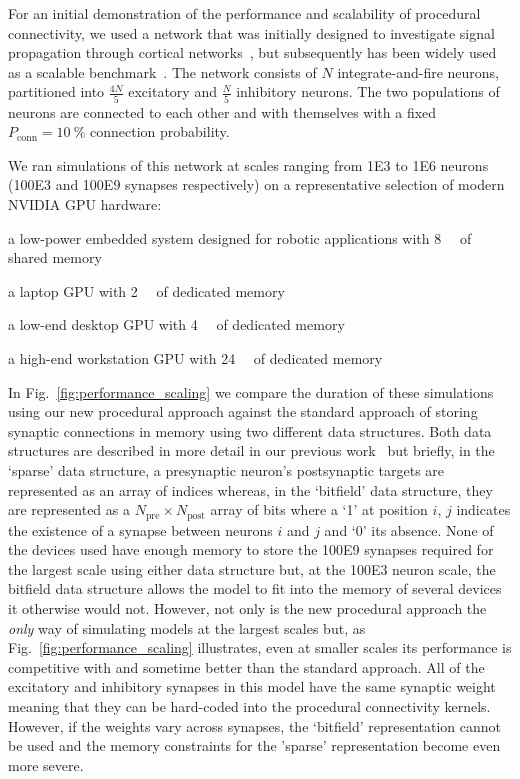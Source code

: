 \documentclass[9pt,twocolumn,twoside,lineno]{pnas-new}
\begin{document}
For an initial demonstration of the performance and scalability of procedural connectivity, we used a network that was initially designed to investigate signal propagation through cortical networks~\citep{Vogels2005}, but subsequently has been widely used as a scalable benchmark~\citep{Brette2007}.
The network consists of $N$ integrate-and-fire neurons, partitioned into $\frac{4N}{5}$ excitatory and $\frac{N}{5}$ inhibitory neurons.
The two populations of neurons are connected to each other and with themselves with a fixed $P_{\text{conn}}=\SI{10}{\percent}$ connection probability.

We ran simulations of this network at scales ranging from \num{1E3} to \num{1E6} neurons (\num{100E3} and \num{100E9} synapses respectively) on a representative selection of modern NVIDIA GPU hardware:
%
\begin{description}[noitemsep]
    \item [Jetson TX2] a low-power embedded system designed for robotic applications with \SI{8}{\giga\byte} of shared memory
    \item [Geforce MX130] a laptop GPU with \SI{2}{\giga\byte} of dedicated memory
    \item [Geforce GTX 1650] a low-end desktop GPU with \SI{4}{\giga\byte} of dedicated memory
    \item [Titan RTX] a high-end workstation GPU with \SI{24}{\giga\byte} of dedicated memory
\end{description}
%
In Fig.~\ref{fig:performance_scaling} we compare the duration of these simulations using our new procedural approach against the standard approach of storing synaptic connections in memory using two different data structures.
Both data structures are described in more detail in our previous work~\citep{Knight2018} but briefly, in the `sparse' data structure, a presynaptic neuron's postsynaptic targets are represented as an array of indices whereas, in the `bitfield' data structure, they are represented as a $N_{\text{pre}} \times N_{\text{post}}$ array of bits where a `1' at position $i$, $j$ indicates the existence of a synapse between neurons $i$ and $j$ and `0' its absence.
None of the devices used have enough memory to store the \num{100E9} synapses required for the largest scale using either data structure but, at the \num{100E3} neuron scale, the bitfield data structure allows the model to fit into the memory of several devices it otherwise would not.
However, not only is the new procedural approach the \emph{only} way of simulating models at the largest scales but, as Fig.~\ref{fig:performance_scaling} illustrates, even at smaller scales its performance is competitive with and sometime better than the standard approach.
All of the excitatory and inhibitory synapses in this model have the same synaptic weight meaning that they can be hard-coded into the procedural connectivity kernels.
However, if the weights vary across synapses, the `bitfield' representation cannot be used and the memory constraints for the 'sparse' representation become even more severe.
\end{document}
